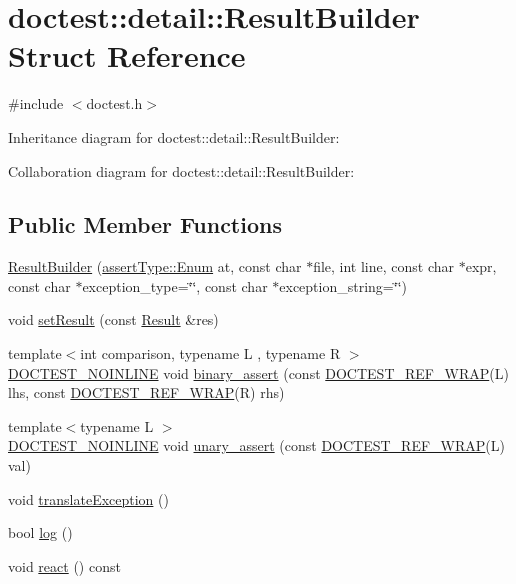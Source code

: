 \hypertarget{structdoctest_1_1detail_1_1ResultBuilder}{}\section{doctest\+:\+:detail\+:\+:Result\+Builder Struct Reference}
\label{structdoctest_1_1detail_1_1ResultBuilder}


{\ttfamily \#include $<$doctest.\+h$>$}



Inheritance diagram for doctest\+:\+:detail\+:\+:Result\+Builder\+:


Collaboration diagram for doctest\+:\+:detail\+:\+:Result\+Builder\+:
\subsection*{Public Member Functions}
\begin{DoxyCompactItemize}
\item 
\hyperlink{structdoctest_1_1detail_1_1ResultBuilder_af1af5a8d0991b4fe3548107f111e968d}{Result\+Builder} (\hyperlink{namespacedoctest_1_1assertType_ae1bb5bed722f34f1c38b83cb19d326d3}{assert\+Type\+::\+Enum} at, const char $\ast$file, int line, const char $\ast$expr, const char $\ast$exception\+\_\+type=\char`\"{}\char`\"{}, const char $\ast$exception\+\_\+string=\char`\"{}\char`\"{})
\item 
void \hyperlink{structdoctest_1_1detail_1_1ResultBuilder_a86c0ca727fead43263de4a7e9a59ad23}{set\+Result} (const \hyperlink{structdoctest_1_1detail_1_1Result}{Result} \&res)
\item 
{\footnotesize template$<$int comparison, typename L , typename R $>$ }\\\hyperlink{doctest_8h_a47e9d3609dfcc90b9a630ff33b9524d6}{D\+O\+C\+T\+E\+S\+T\+\_\+\+N\+O\+I\+N\+L\+I\+NE} void \hyperlink{structdoctest_1_1detail_1_1ResultBuilder_ab3d55b158b3ae687f80bca94db6bb701}{binary\+\_\+assert} (const \hyperlink{doctest_8h_af2901cafb023c57fb672ccb1bf14f2eb}{D\+O\+C\+T\+E\+S\+T\+\_\+\+R\+E\+F\+\_\+\+W\+R\+AP}(L) lhs, const \hyperlink{doctest_8h_af2901cafb023c57fb672ccb1bf14f2eb}{D\+O\+C\+T\+E\+S\+T\+\_\+\+R\+E\+F\+\_\+\+W\+R\+AP}(R) rhs)
\item 
{\footnotesize template$<$typename L $>$ }\\\hyperlink{doctest_8h_a47e9d3609dfcc90b9a630ff33b9524d6}{D\+O\+C\+T\+E\+S\+T\+\_\+\+N\+O\+I\+N\+L\+I\+NE} void \hyperlink{structdoctest_1_1detail_1_1ResultBuilder_a98c33e90242e2859255a79cb38489f3b}{unary\+\_\+assert} (const \hyperlink{doctest_8h_af2901cafb023c57fb672ccb1bf14f2eb}{D\+O\+C\+T\+E\+S\+T\+\_\+\+R\+E\+F\+\_\+\+W\+R\+AP}(L) val)
\item 
void \hyperlink{structdoctest_1_1detail_1_1ResultBuilder_a5eece6aa3b1a2cb366cf5a0cc6c854a3}{translate\+Exception} ()
\item 
bool \hyperlink{structdoctest_1_1detail_1_1ResultBuilder_a2af75dd1d8db8d3aa949d78025854085}{log} ()
\item 
void \hyperlink{structdoctest_1_1detail_1_1ResultBuilder_a03686f862471728c2980d72e02980213}{react} () const
\end{DoxyCompactItemize}
